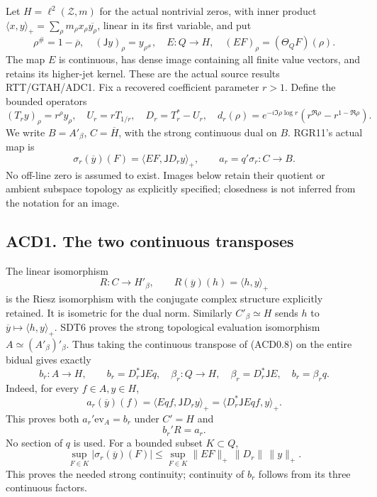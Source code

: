 Let \(H=\ell^2(\mathscr Z,m)\) for the actual nontrivial zeros, with
inner product
\(\langle x,y\rangle_+=\sum_\rho m_\rho x_\rho\overline{y_\rho}\),
linear in its first variable, and put \[
\rho^\#=1-\overline\rho,\quad (\mathsf Jy)_\rho=y_{\rho^\#},\quad
E:Q\to H,\quad (EF)_\rho=(\Theta_QF)(\rho).
\tag{ACD0.6}
\] The map \(E\) is continuous, has dense image containing all finite
value vectors, and retains its higher-jet kernel. These are the actual
source results RTT/GTAH/ADC1. Fix a recovered coefficient parameter
\(r>1\). Define the bounded operators \[
(T_ry)_\rho=r^\rho y_\rho,\quad U_r=rT_{1/r},\quad
D_r=T_r^*-U_r,\quad
d_r(\rho)=e^{-i\Im\rho\log r}(r^{\Re\rho}-r^{1-\Re\rho}).
\tag{ACD0.7}
\] We write \(B=A'_\beta\), \(C=\overline H\), with the strong
continuous dual on \(B\). RGR11's actual map is \[
\sigma_r(\overline y)(F)=\langle EF,\mathsf JD_ry\rangle_+,
\qquad a_r=q'\sigma_r:C\to B.
\tag{ACD0.8}
\] No off-line zero is assumed to exist. Images below retain their
quotient or ambient subspace topology as explicitly specified;
closedness is not inferred from the notation for an image.

\subsection{ACD1. The two continuous
transposes}\label{acd1.-the-two-continuous-transposes}

The linear isomorphism \[
R:C\longrightarrow H'_\beta,\qquad
R(\overline y)(h)=\langle h,y\rangle_+
\tag{ACD1.1}
\] is the Riesz isomorphism with the conjugate complex structure
explicitly retained. It is isometric for the dual norm. Similarly
\(C'_\beta\simeq H\) sends \(h\) to
\(\overline y\mapsto\langle h,y\rangle_+\). SDT6 proves the strong
topological evaluation isomorphism \(A\simeq(A'_\beta)'_\beta\). Thus
taking the continuous transpose of (ACD0.8) on the entire bidual gives
exactly \[
b_r:A\to H,\qquad b_r=D_r^*\mathsf JEq,
\quad \beta_r:Q\to H,\quad\beta_r=D_r^*\mathsf JE,
\quad b_r=\beta_rq.
\tag{ACD1.2}
\] Indeed, for every \(f\in A,y\in H\), \[
a_r(\overline y)(f)=\langle Eqf,\mathsf JD_ry\rangle_+
=\langle D_r^*\mathsf JEqf,y\rangle_+.
\tag{ACD1.3}
\] This proves both \(a_r'\mathrm{ev}_A=b_r\) under \(C'=H\) and \[
b_r'R=a_r.
\tag{ACD1.4}
\] No section of \(q\) is used. For a bounded subset \(K\subset Q\), \[
\sup_{F\in K}|\sigma_r(\overline y)(F)|
\leq\sup_{F\in K}\|EF\|_+\,\|D_r\|\,\|y\|_+.
\tag{ACD1.5}
\] This proves the needed strong continuity; continuity of \(b_r\)
follows from its three continuous factors.

